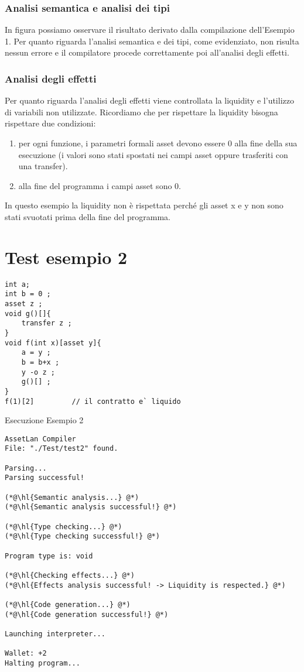 \documentclass[12pt,twoside,openright,a4paper]{report}
\begin{document}
\subsubsection{Analisi semantica e analisi dei tipi}
In figura possiamo osservare il risultato derivato dalla compilazione dell'Esempio 1. Per quanto riguarda l'analisi semantica e dei tipi, come evidenziato, non risulta nessun errore e il compilatore procede correttamente poi all'analisi degli effetti.

\subsubsection{Analisi degli effetti}
Per quanto riguarda l'analisi degli effetti viene controllata la liquidity e l'utilizzo di variabili non utilizzate. Ricordiamo che per rispettare la liquidity bisogna rispettare due condizioni:
\begin{enumerate}
    \item per ogni funzione, i parametri formali asset devono essere 0 alla fine della sua esecuzione (i valori sono stati spostati nei campi asset oppure trasferiti con una transfer).
    \item  alla fine del programma i campi asset sono 0.
\end{enumerate}
In questo esempio la liquidity non è rispettata perché gli asset x e y non sono stati svuotati prima della fine del programma.

\section{Test esempio 2}
\begin{lstlisting}
int a;
int b = 0 ;
asset z ;
void g()[]{
    transfer z ;
}
void f(int x)[asset y]{
    a = y ;
    b = b+x ;
    y -o z ;
	g()[] ;
}
f(1)[2] 		// il contratto e` liquido
\end{lstlisting}
Esecuzione Esempio 2
\begin{lstlisting}
AssetLan Compiler
File: "./Test/test2" found.

Parsing...
Parsing successful!

(*@\hl{Semantic analysis...} @*)
(*@\hl{Semantic analysis successful!} @*)

(*@\hl{Type checking...} @*)
(*@\hl{Type checking successful!} @*)

Program type is: void

(*@\hl{Checking effects...} @*)
(*@\hl{Effects analysis successful! -> Liquidity is respected.} @*)

(*@\hl{Code generation...} @*)
(*@\hl{Code generation successful!} @*)

Launching interpreter...

Wallet: +2
Halting program...
\end{lstlisting}
\end{document}
